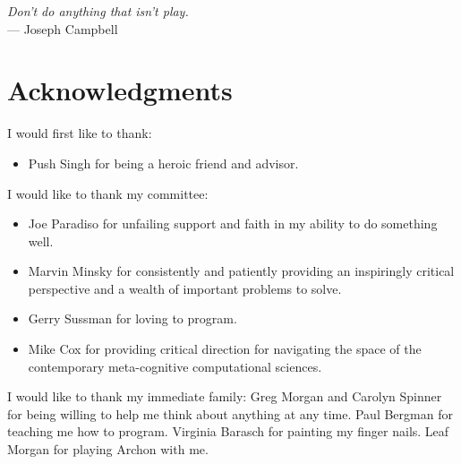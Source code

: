 



\begin{flushright}{\slshape    
Don't do anything that isn't play.} \\ \medskip
    --- Joseph Campbell
\end{flushright}



\bigskip

\begingroup
\let\clearpage\relax
\let\cleardoublepage\relax
\let\cleardoublepage\relax
\chapter*{Acknowledgments}

I would first like to thank:
\begin{itemize}
\item{Push Singh for being a heroic friend and advisor.}
\end{itemize}

\vspace{5mm}

\noindent I would like to thank my committee:
\begin{itemize}
\item{Joe Paradiso for unfailing support and faith in my ability to do
  something well.}
\item{Marvin Minsky for consistently and patiently providing an
  inspiringly critical perspective and a wealth of important problems
  to solve.}
\item{Gerry Sussman for loving to program.}
\item{Mike Cox for providing critical direction for navigating the
  space of the contemporary meta-cognitive computational sciences.}
\end{itemize}

\vspace{5mm}

\noindent I would like to thank my immediate family:
Greg Morgan and Carolyn Spinner for being willing to help me think about anything at any time.
Paul Bergman for teaching me how to program.
Virginia Barasch for painting my finger nails.
Leaf Morgan for playing Archon with me.

